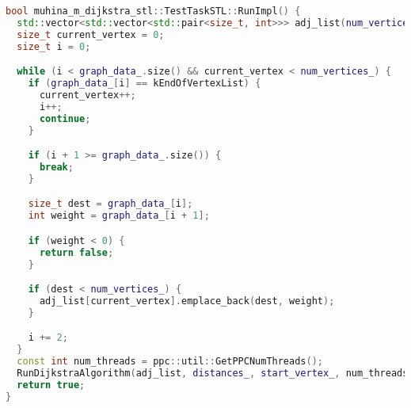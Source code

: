 \documentclass[12pt]{article}
\begin{document}
\begin{lstlisting}[language=C++]
bool muhina_m_dijkstra_stl::TestTaskSTL::RunImpl() {
  std::vector<std::vector<std::pair<size_t, int>>> adj_list(num_vertices_);
  size_t current_vertex = 0;
  size_t i = 0;

  while (i < graph_data_.size() && current_vertex < num_vertices_) {
    if (graph_data_[i] == kEndOfVertexList) {
      current_vertex++;
      i++;
      continue;
    }

    if (i + 1 >= graph_data_.size()) {
      break;
    }

    size_t dest = graph_data_[i];
    int weight = graph_data_[i + 1];

    if (weight < 0) {
      return false;
    }

    if (dest < num_vertices_) {
      adj_list[current_vertex].emplace_back(dest, weight);
    }

    i += 2;
  }
  const int num_threads = ppc::util::GetPPCNumThreads();
  RunDijkstraAlgorithm(adj_list, distances_, start_vertex_, num_threads);
  return true;
}
\end{lstlisting}
\end{document}
